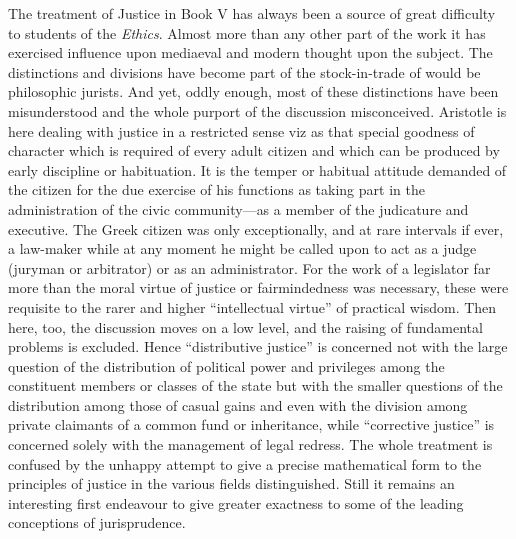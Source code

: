 The treatment of Justice in Book V has always been a source of great difficulty
to students of the \emph{Ethics}. Almost more than any other part of the work
it has exercised influence upon mediaeval and modern thought upon the subject.
The distinctions and divisions have become part of the stock-in-trade of would
be philosophic jurists. And yet, oddly enough, most of these distinctions have
been misunderstood and the whole purport of the discussion misconceived.
Aristotle is here dealing with justice in a restricted sense viz as that
special goodness of character which is required of every adult citizen and
which can be produced by early discipline or habituation. It is the temper or
habitual attitude demanded of the citizen for the due exercise of his functions
as taking part in the administration of the civic community—as a member
of the judicature and executive. The Greek citizen was only exceptionally, and
at rare intervals if ever, a law-maker while at any moment he might be called
upon to act as a judge (juryman or arbitrator) or as an administrator. For the
work of a legislator far more than the moral virtue of justice or
fairmindedness was necessary, these were requisite to the rarer and higher
“intellectual virtue” of practical wisdom. Then here, too, the
discussion moves on a low level, and the raising of fundamental problems is
excluded. Hence “distributive justice” is concerned not with the
large question of the distribution of political power and privileges among the
constituent members or classes of the state but with the smaller questions of
the distribution among those of casual gains and even with the division among
private claimants of a common fund or inheritance, while “corrective
justice” is concerned solely with the management of legal redress. The
whole treatment is confused by the unhappy attempt to give a precise
mathematical form to the principles of justice in the various fields
distinguished. Still it remains an interesting first endeavour to give greater
exactness to some of the leading conceptions of jurisprudence.

